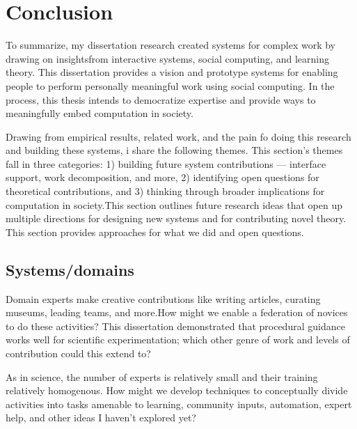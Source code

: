 
\chapter{Conclusion}

To summarize, my dissertation research created systems for complex work by drawing on insightsfrom interactive systems, social computing, and learning theory. This dissertation provides a vision and prototype systems for enabling people to perform personally meaningful work using social computing. In the process, this thesis intends to democratize expertise and provide ways to meaningfully embed computation in society. 

Drawing from empirical results, related work, and the pain fo doing this research and building these systems, i share the following themes. This section's themes fall in three categories: 1) building future system contributions — interface support, work decomposition, and more, 2) identifying open questions for theoretical contributions, and 3) thinking through broader implications for computation in society.This section outlines future research ideas that open up multiple directions for designing new systems and for contributing novel theory. This section provides approaches for what we did and open questions.


\section{Systems/domains} 


Domain experts make creative contributions like writing articles, curating museums, leading teams, and more.How might we enable a federation of novices to do these activities? This dissertation demonstrated that procedural guidance works well for scientific experimentation; which other genre of work and levels of contribution could this extend to? 

As in science, the number of experts is relatively small and their training relatively homogenous. How might we develop techniques to conceptually divide activities into tasks amenable to learning, community inputs, automation, expert help, and other ideas I haven’t explored yet?

